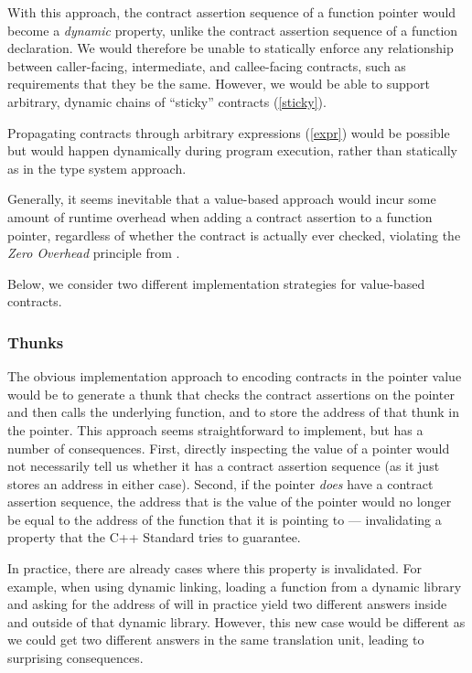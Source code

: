 With this approach, the contract assertion sequence of a function pointer would become a \emph{dynamic} property, unlike the contract assertion sequence of a function declaration. We would therefore be unable to statically enforce any relationship between caller-facing, intermediate, and callee-facing contracts, such as requirements that they be the same. However, we would be able to support arbitrary, dynamic chains of ``sticky'' contracts (\ref{sticky}). 

Propagating contracts through arbitrary expressions (\ref{expr}) would be possible but would happen dynamically during program execution, rather than statically as in the type system approach.

Generally, it seems inevitable that a value-based approach would incur some amount of runtime overhead when adding a contract assertion to a function pointer, regardless of whether the contract is actually ever checked, violating the \emph{Zero Overhead} principle from \cite{P2900R8}.

Below, we consider two different implementation strategies for value-based contracts.

\subsubsection{Thunks}

The obvious implementation approach to encoding contracts in the pointer value would be to generate a thunk that checks the contract assertions on the pointer and then calls the underlying function, and to store the address of that thunk in the pointer. This approach seems straightforward to implement, but has a number of consequences. First, directly inspecting the value of a pointer would not necessarily tell us whether it has a contract assertion sequence (as it just stores an address in either case). Second, if the pointer \emph{does} have a contract assertion sequence, the address that is the value of the pointer would no longer be equal to the address of the function that it is pointing to --- invalidating a property that the C++ Standard tries to guarantee.

In practice, there are already cases where this property is invalidated. For example, when using dynamic linking, loading a function  from a dynamic library and asking for the address of  will in practice yield two different answers inside and outside of that dynamic library. However, this new case would be different as we could get two different answers in the same translation unit, leading to surprising consequences.

